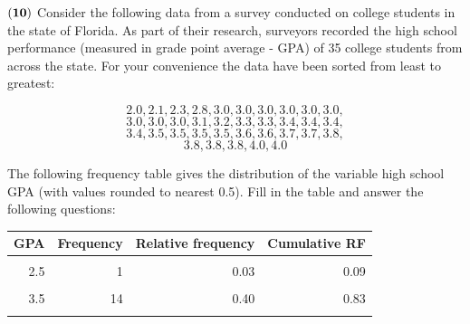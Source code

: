 \documentclass[
]{article}
\begin{document}
\({\bf (10)}\) Consider the following data from a survey conducted on
college students in the state of Florida. As part of their research,
surveyors recorded the high school performance (measured in grade point
average - GPA) of 35 college students from across the state. For your
convenience the data have been sorted from least to greatest:

\[2.0, 2.1, 2.3, 2.8, 3.0, 3.0, 3.0, 3.0, 3.0, 3.0,\]
\[3.0, 3.0, 3.0, 3.1, 3.2, 3.3, 3.3, 3.4,  3.4, 3.4,\]
\[3.4, 3.5, 3.5, 3.5, 3.5, 3.6, 3.6, 3.7, 3.7, 3.8,\]
\[3.8, 3.8, 3.8, 4.0, 4.0\]

The following frequency table gives the distribution of the variable
high school GPA (with values rounded to nearest 0.5). Fill in the table
and answer the following questions:

\begin{table}[H]
\centering\centering
\begin{tabular}{rrrr}
\toprule
GPA & Frequency & Relative frequency & Cumulative RF\\
\midrule
\cellcolor{gray!10}{2.0} & \cellcolor{gray!10}{2} & \cellcolor{gray!10}{0.06} & \cellcolor{gray!10}{0.06}\\
2.5 & 1 & 0.03 & 0.09\\
\cellcolor{gray!10}{3.0} & \cellcolor{gray!10}{12} & \cellcolor{gray!10}{0.34} & \cellcolor{gray!10}{0.43}\\
3.5 & 14 & 0.40 & 0.83\\
\cellcolor{gray!10}{4.0} & \cellcolor{gray!10}{6} & \cellcolor{gray!10}{0.17} & \cellcolor{gray!10}{1.00}\\
\bottomrule
\end{tabular}
\end{table}
\end{document}
